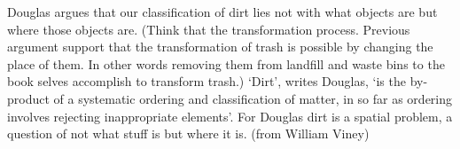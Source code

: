 


Douglas argues that our classification of dirt lies not with what objects are but where those objects are. (Think that the transformation process. Previous argument support that the transformation of trash is possible by changing the place of them. In other words removing them from landfill and waste bins to the book selves accomplish to transform trash.) ‘Dirt’, writes Douglas, ‘is the by-product of a systematic ordering and classification of matter, in so far as ordering involves rejecting inappropriate elements’. For Douglas dirt is a spatial problem, a question of not what stuff is but where it is. (from William Viney)

